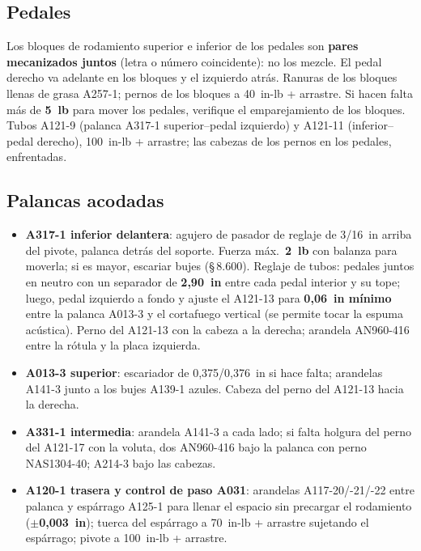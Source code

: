 \subsection{Pedales}

Los bloques de rodamiento superior e inferior de los pedales son \textbf{pares mecanizados juntos} (letra o número coincidente): no los mezcle. El pedal derecho va adelante en los bloques y el izquierdo atrás. Ranuras de los bloques llenas de grasa A257-1; pernos de los bloques a 40~in-lb + arrastre. Si hacen falta más de \textbf{5~lb} para mover los pedales, verifique el emparejamiento de los bloques. Tubos A121-9 (palanca A317-1 superior--pedal izquierdo) y A121-11 (inferior--pedal derecho), 100~in-lb + arrastre; las cabezas de los pernos en los pedales, enfrentadas.

\subsection{Palancas acodadas}

\begin{itemize}
\item \textbf{A317-1 inferior delantera}: agujero de pasador de reglaje de 3/16~in arriba del pivote, palanca detrás del soporte. Fuerza máx.\ \textbf{2~lb} con balanza para moverla; si es mayor, escariar bujes (\S\,8.600). Reglaje de tubos: pedales juntos en neutro con un separador de \textbf{2,90~in} entre cada pedal interior y su tope; luego, pedal izquierdo a fondo y ajuste el A121-13 para \textbf{0,06~in mínimo} entre la palanca A013-3 y el cortafuego vertical (se permite tocar la espuma acústica). Perno del A121-13 con la cabeza a la derecha; arandela AN960-416 entre la rótula y la placa izquierda.
\item \textbf{A013-3 superior}: escariador de 0,375/0,376~in si hace falta; arandelas A141-3 junto a los bujes A139-1 azules. Cabeza del perno del A121-13 hacia la derecha.
\item \textbf{A331-1 intermedia}: arandela A141-3 a cada lado; si falta holgura del perno del A121-17 con la voluta, dos AN960-416 bajo la palanca con perno NAS1304-40; A214-3 bajo las cabezas.
\item \textbf{A120-1 trasera y control de paso A031}: arandelas A117-20/-21/-22 entre palanca y espárrago A125-1 para llenar el espacio sin precargar el rodamiento (\textbf{$\pm$0,003~in}); tuerca del espárrago a 70~in-lb + arrastre sujetando el espárrago; pivote a 100~in-lb + arrastre.
\end{itemize}

